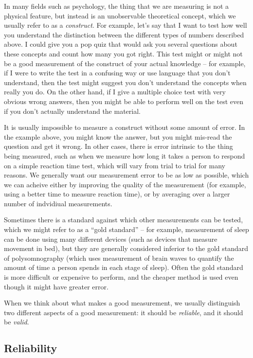 \documentclass[12pt,]{book}
\theoremstyle{definition}
\theoremstyle{definition}
\theoremstyle{definition}
\theoremstyle{remark}
\begin{document}
In many fields such as psychology, the thing that we are measuring is not a physical feature, but instead is an unobservable theoretical concept, which we usually refer to as a \emph{construct}. For example, let's say that I want to test how well you understand the distinction between the different types of numbers described above. I could give you a pop quiz that would ask you several questions about these concepts and count how many you got right. This test might or might not be a good measurement of the construct of your actual knowledge -- for example, if I were to write the test in a confusing way or use language that you don't understand, then the test might suggest you don't understand the concepts when really you do. On the other hand, if I give a multiple choice test with very obvious wrong answers, then you might be able to perform well on the test even if you don't actually understand the material.

It is usually impossible to measure a construct without some amount of error. In the example above, you might know the answer, but you might mis-read the question and get it wrong. In other cases, there is error intrinsic to the thing being measured, such as when we measure how long it takes a person to respond on a simple reaction time test, which will vary from trial to trial for many reasons. We generally want our measurement error to be as low as possible, which we can acheive either by improving the quality of the measurement (for example, using a better time to measure reaction time), or by averaging over a larger number of indvidiual measurements.

Sometimes there is a standard against which other measurements can be tested, which we might refer to as a ``gold standard'' -- for example, measurement of sleep can be done using many different devices (such as devices that measure movement in bed), but they are generally considered inferior to the gold standard of polysomnography (which uses measurement of brain waves to quantify the amount of time a person spends in each stage of sleep). Often the gold standard is more difficult or expensive to perform, and the cheaper method is used even though it might have greater error.

When we think about what makes a good measurement, we usually distinguish two different aspects of a good measurement: it should be \emph{reliable}, and it should be \emph{valid}.

\hypertarget{reliability}{%
\subsection{Reliability}\label{reliability}}
\end{document}
